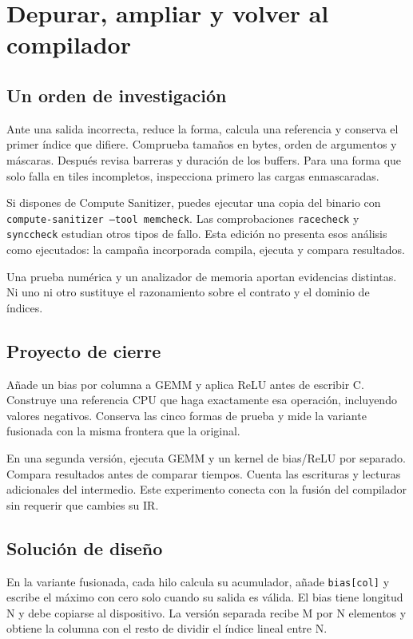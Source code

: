 \documentclass[12pt,a4paper,oneside]{report}
\begin{document}
\chapter{Depurar, ampliar y volver al compilador}
\section{Un orden de investigación}
Ante una salida incorrecta, reduce la forma, calcula una referencia y conserva el primer índice que difiere. Comprueba tamaños en bytes, orden de argumentos y máscaras. Después revisa barreras y duración de los buffers. Para una forma que solo falla en tiles incompletos, inspecciona primero las cargas enmascaradas.

Si dispones de Compute Sanitizer, puedes ejecutar una copia del binario con \texttt{compute-sani\allowbreak{}tizer --tool\allowbreak{} memcheck}. Las comprobaciones \texttt{racecheck} y \texttt{synccheck} estudian otros tipos de fallo. Esta edición no presenta esos análisis como ejecutados: la campaña incorporada compila, ejecuta y compara resultados.

Una prueba numérica y un analizador de memoria aportan evidencias distintas. Ni uno ni otro sustituye el razonamiento sobre el contrato y el dominio de índices.

\section{Proyecto de cierre}
Añade un bias por columna a GEMM y aplica ReLU antes de escribir C. Construye una referencia CPU que haga exactamente esa operación, incluyendo valores negativos. Conserva las cinco formas de prueba y mide la variante fusionada con la misma frontera que la original.

En una segunda versión, ejecuta GEMM y un kernel de bias/ReLU por separado. Compara resultados antes de comparar tiempos. Cuenta las escrituras y lecturas adicionales del intermedio. Este experimento conecta con la fusión del compilador sin requerir que cambies su IR.

\section{Solución de diseño}
En la variante fusionada, cada hilo calcula su acumulador, añade \texttt{bias[col]} y escribe el máximo con cero solo cuando su salida es válida. El bias tiene longitud N y debe copiarse al dispositivo. La versión separada recibe M por N elementos y obtiene la columna con el resto de dividir el índice lineal entre N.
\end{document}
